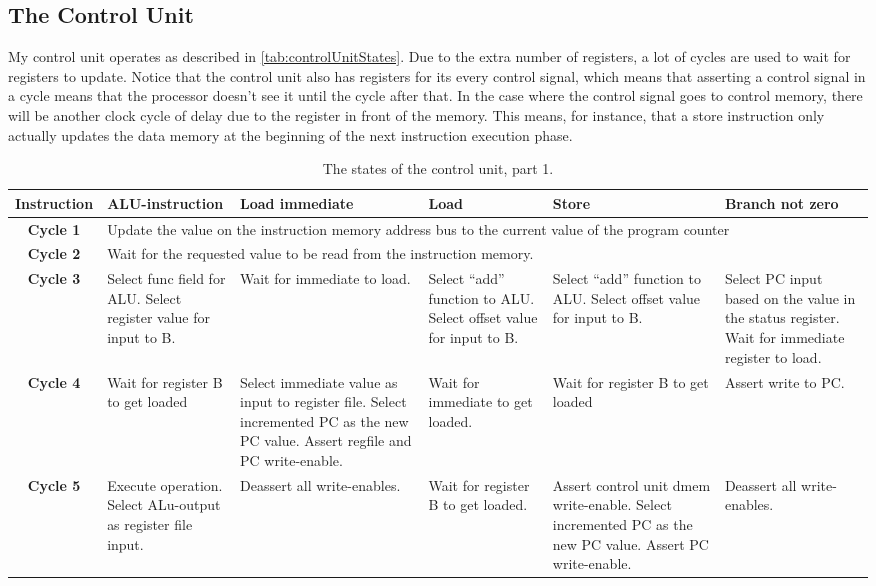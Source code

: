 \documentclass[11pt]{article}
\begin{document}
\subsection{The Control Unit}
\label{subsec:controlunit}
My control unit operates as described in
\autoref{tab:controlUnitStates}. Due to the extra number of registers,
a lot of cycles are used to wait for registers to update. Notice that
the control unit also has registers for its every control signal,
which means that asserting a control signal in a cycle means that the
processor doesn't see it until the cycle after that. In the case where
the control signal goes to control memory, there will be another clock
cycle of delay due to the register in front of the memory. This means,
for instance, that a store instruction only actually updates the data
memory at the beginning of the next instruction execution phase.
\begin{table}[htbp]
  \centering
  \begin{tabular}{|c|p{50pt}|p{50pt}|p{50pt}|p{50pt}|p{50pt}|}
    \hline
    {\bf Instruction} & ALU-instruction & Load immediate & Load & Store & Branch not zero \\ \hline
    {\bf Cycle 1} & \multicolumn{5}{|p{200pt}|}{Update the value on the instruction memory address bus to the current value of the program counter} \\ \hline
    {\bf Cycle 2} & \multicolumn{5}{|p{200pt}|}{Wait for the requested value to be read from the instruction memory.} \\ \hline
    {\bf Cycle 3} & Select func field for ALU. Select register value for input to B. & Wait for immediate to load. & Select ``add'' function to ALU. Select offset value for input to B. & Select ``add'' function to ALU. Select offset value for input to B. & Select PC input based on the value in the status register. Wait for immediate register to load. \\ \hline
    {\bf Cycle 4} & Wait for register B to get loaded & Select immediate value as input to register file. Select incremented PC as the new PC value. Assert regfile and PC write-enable.  & Wait for immediate to get loaded. & Wait for register B to get loaded & Assert write to PC.  \\ \hline
    {\bf Cycle 5} & Execute operation. Select ALu-output as register file input. & Deassert all write-enables. & Wait for register B to get loaded. & Assert control unit dmem write-enable. Select incremented PC as the new PC value. Assert PC write-enable. & Deassert all write-enables. \\ \hline
  \end{tabular}
  \caption{The states of the control unit, part 1.}
  \label{tab:controlUnitStates}
\end{table}
\end{document}
